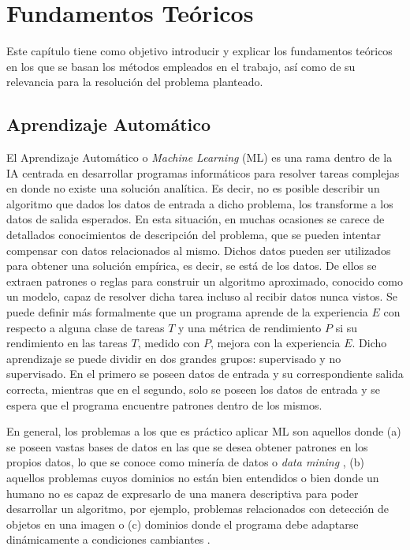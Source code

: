 \chapter{Fundamentos Teóricos}
Este capítulo tiene como objetivo introducir y explicar los fundamentos teóricos en los que se basan los métodos empleados en el trabajo, así como de su relevancia para la resolución del problema planteado.

\section{Aprendizaje Automático}
El Aprendizaje Automático o \textit{Machine Learning} (ML) \cite{abu-mostafa_learning_2012, mitchell_introduction_1997, 6284961} es una rama dentro de la IA centrada en desarrollar programas informáticos para resolver tareas complejas en donde no existe una solución analítica. Es decir, no es posible describir un algoritmo que dados los datos de entrada a dicho problema, los transforme a los datos de salida esperados. En esta situación, en muchas ocasiones se carece de detallados conocimientos de descripción del problema, que se pueden intentar compensar con datos relacionados al mismo. Dichos datos pueden ser utilizados para obtener una solución empírica, es decir, se está  de los datos. De ellos se extraen patrones o reglas para construir un algoritmo aproximado, conocido como un modelo, capaz de resolver dicha tarea incluso al recibir datos nunca vistos. Se puede definir más formalmente que un programa aprende de la experiencia $E$ con respecto a alguna clase de tareas $T$ y una métrica de rendimiento $P$ si su rendimiento en las tareas $T$, medido con $P$, mejora con la experiencia $E$. Dicho aprendizaje se puede dividir en dos grandes grupos: supervisado y no supervisado. En el primero se poseen datos de entrada y su correspondiente salida correcta, mientras que en el segundo, solo se poseen los datos de entrada y se espera que el programa encuentre patrones dentro de los mismos.

En general, los problemas a los que es práctico aplicar ML son aquellos donde (a) se poseen vastas bases de datos en las que se desea obtener patrones en los propios datos, lo que se conoce como minería de datos o \textit{data mining} \cite{alma991006986149704990}, (b) aquellos problemas cuyos dominios no están bien entendidos o bien donde un humano no es capaz de expresarlo de una manera descriptiva para poder desarrollar un algoritmo, por ejemplo, problemas relacionados con detección de objetos en una imagen o (c) dominios donde el programa debe adaptarse dinámicamente a condiciones cambiantes \cite{mitchell_introduction_1997}. 


